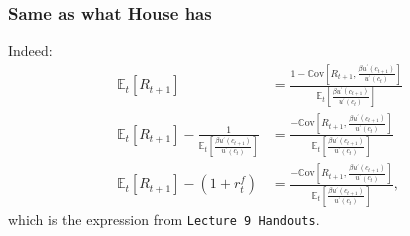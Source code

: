 \documentclass[presentation]{beamer}
\begin{document}
\begin{frame}
\frametitle{Same as what House has}
Indeed:
\begin{align*}
\mathbb{E}_{t} \left[ R_{t+1} \right] &=
\frac{1 - \mathbb{C} \text{ov} \left[ R_{t+1}, \frac{\beta u^{\prime}(c_{t+1})}{u^{\prime}(c_{t})} \right]}{
  \mathbb{E}_{t} \left[ \frac{\beta u^{\prime}(c_{t+1})}{u^{\prime}(c_{t})} \right]} \\
\mathbb{E}_{t} \left[ R_{t+1} \right] - \frac{1}{\mathbb{E}_{t} \left[ \frac{\beta u^{\prime}(c_{t+1})}{u^{\prime}(c_{t})} \right]} &=
\frac{- \mathbb{C} \text{ov} \left[ R_{t+1}, \frac{\beta u^{\prime}(c_{t+1})}{u^{\prime}(c_{t})} \right]}{
  \mathbb{E}_{t} \left[ \frac{\beta u^{\prime}(c_{t+1})}{u^{\prime}(c_{t})} \right]} \\
\mathbb{E}_{t} \left[ R_{t+1} \right] - (1+r_{t}^{f}) &= \frac{- \mathbb{C} \text{ov} \left[ R_{t+1}, \frac{\beta u^{\prime}(c_{t+1})}{u^{\prime}(c_{t})} \right]}{
  \mathbb{E}_{t} \left[ \frac{\beta u^{\prime}(c_{t+1})}{u^{\prime}(c_{t})} \right]},
\end{align*}
which is the expression from \texttt{Lecture 9 Handouts}.
\end{frame}
\end{document}
